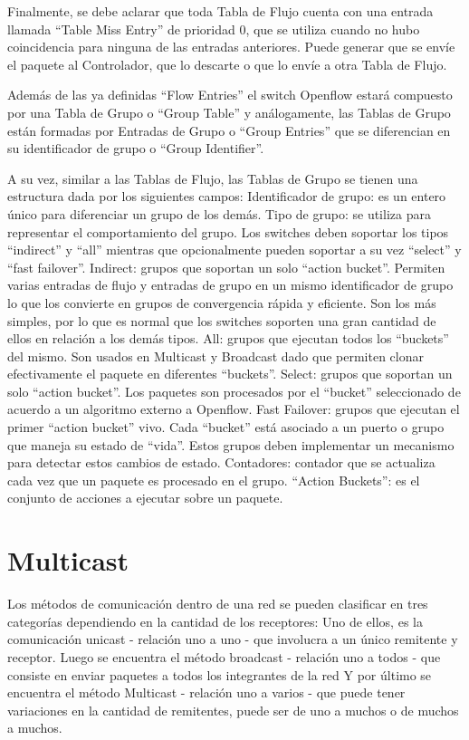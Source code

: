 \documentclass[12pt,a4paper,oneside]{book}
\begin{document}
	Finalmente, se debe aclarar que toda Tabla de Flujo cuenta con una entrada llamada “Table Miss Entry” de prioridad 0, que se utiliza cuando no hubo coincidencia para ninguna de las entradas anteriores. Puede generar que se envíe el paquete al Controlador, que lo descarte o que lo envíe a otra Tabla de Flujo.

	Además de las ya definidas “Flow Entries” el switch Openflow estará compuesto por una Tabla de Grupo o “Group Table” y análogamente, las Tablas de Grupo están formadas por Entradas de Grupo o “Group Entries” que se diferencian en su identificador de grupo o “Group Identifier”.
	
	A su vez, similar a las Tablas de Flujo, las Tablas de Grupo se tienen una estructura dada por los siguientes campos:
Identificador de grupo: es un entero único para diferenciar un grupo de los demás.
Tipo de grupo: se utiliza para representar el comportamiento del grupo. Los switches deben soportar los tipos “indirect” y “all” mientras que opcionalmente pueden soportar a su vez “select” y “fast failover”.
Indirect: grupos que soportan un solo “action bucket”. Permiten varias entradas de flujo y entradas de grupo en un mismo identificador de grupo lo que los convierte en grupos de convergencia rápida y  eficiente. Son los más simples, por lo que es normal que los switches soporten una gran cantidad de ellos en relación a los demás tipos.
All: grupos que ejecutan todos los “buckets” del mismo. Son usados en Multicast y Broadcast dado que permiten clonar efectivamente el paquete en diferentes “buckets”.
Select: grupos que soportan un solo “action bucket”. Los paquetes son procesados por el “bucket” seleccionado de acuerdo a un algoritmo externo a Openflow.
Fast Failover: grupos que ejecutan el primer “action bucket” vivo. Cada “bucket” está asociado a un puerto o grupo que maneja su estado de “vida”. Estos grupos deben implementar un mecanismo para detectar estos cambios de estado.
Contadores: contador que se actualiza cada vez que un paquete es procesado en el grupo.
“Action Buckets”: es el conjunto de acciones a ejecutar sobre un paquete.



\section{Multicast}
\label{marco_multicast}

Los métodos de comunicación dentro de una red se pueden clasificar en tres categorías dependiendo en la cantidad de los receptores:
Uno de ellos, es  la comunicación unicast - relación uno a uno - que involucra a un único remitente y receptor. 
Luego se encuentra el método broadcast - relación uno a todos - que consiste en enviar paquetes a todos los integrantes de la red 
Y por último se encuentra el  método Multicast - relación uno a varios - que puede tener variaciones en la cantidad de remitentes, puede ser de uno a muchos o de muchos a muchos.
\end{document}

